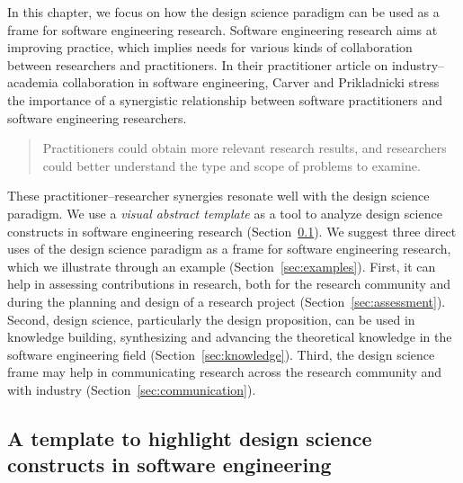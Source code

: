 \documentclass[graybox]{svmult}
\begin{document}
In this chapter, we focus on how the design science paradigm can be used as a frame for software engineering research. Software engineering research aims at improving practice, which implies needs for various kinds of collaboration between researchers and practitioners. In their practitioner article on industry--academia collaboration in software engineering, Carver and Prikladnicki stress the importance of a synergistic relationship between software practitioners and software engineering researchers.
\begin{quote}Practitioners could obtain more relevant research results, and researchers could better understand the type and scope of problems to examine.~\cite{CarverIEEESW2018}
\end{quote} 

These practitioner--researcher synergies resonate well with the design science paradigm.  We use a \emph{visual abstract template} as a tool to analyze design science constructs in software engineering research (Section~\ref{sec:VA_template}). We suggest three direct uses of the design science paradigm as a frame for software engineering research, which we illustrate through an example (Section~\ref{sec:examples}). First, it can help in assessing contributions in research, both for the research community and during the planning and design of a research project (Section~\ref{sec:assessment}). Second, design science, particularly the design proposition, can be used in knowledge building, synthesizing and advancing the theoretical knowledge in the software engineering field (Section~\ref{sec:knowledge}). Third, the design science frame may help in communicating research across the research community and with industry (Section~\ref{sec:communication}). 


\subsection{A template to highlight design science constructs in software engineering}
\label{sec:VA_template}

\end{document}
